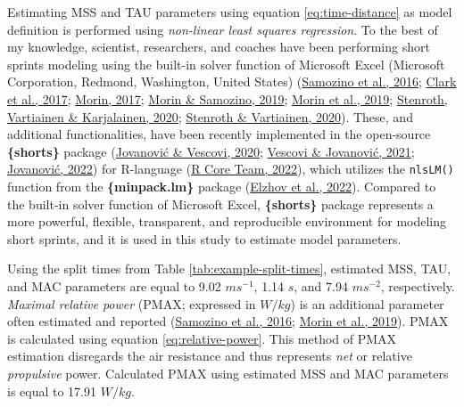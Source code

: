 \documentclass[fleqn,10pt]{wlpeerj} %
\begin{document}
Estimating MSS and TAU parameters using equation \eqref{eq:time-distance} as model definition is performed using \emph{non-linear least squares regression}. To the best of my knowledge, scientist, researchers, and coaches have been performing short sprints modeling using the built-in solver function of Microsoft Excel (Microsoft Corporation, Redmond, Washington, United States) (\protect\hyperlink{ref-samozinoSimpleMethodMeasuring2016}{Samozino et al., 2016}; \protect\hyperlink{ref-clarkNFLCombine40Yard2017}{Clark et al., 2017}; \protect\hyperlink{ref-morinSpreadsheetSprintAcceleration2017}{Morin, 2017}; \protect\hyperlink{ref-morinSpreadsheetSprintAcceleration2019}{Morin \& Samozino, 2019}; \protect\hyperlink{ref-morinSimpleMethodComputing2019}{Morin et al., 2019}; \protect\hyperlink{ref-stenrothForcevelocityProfilingIce2020}{Stenroth, Vartiainen \& Karjalainen, 2020}; \protect\hyperlink{ref-stenrothSpreadsheetSprintAcceleration2020}{Stenroth \& Vartiainen, 2020}). These, and additional functionalities, have been recently implemented in the open-source \textbf{\{shorts\}} package (\protect\hyperlink{ref-jovanovicShortsPackageModeling2020}{Jovanović \& Vescovi, 2020}; \protect\hyperlink{ref-vescoviSprintMechanicalCharacteristics2021}{Vescovi \& Jovanović, 2021}; \protect\hyperlink{ref-R-shorts}{Jovanović, 2022}) for R-language (\protect\hyperlink{ref-R-base}{R Core Team, 2022}), which utilizes the \texttt{nlsLM()} function from the \textbf{\{minpack.lm\}} package (\protect\hyperlink{ref-R-minpack.lm}{Elzhov et al., 2022}). Compared to the built-in solver function of Microsoft Excel, \textbf{\{shorts\}} package represents a more powerful, flexible, transparent, and reproducible environment for modeling short sprints, and it is used in this study to estimate model parameters.

Using the split times from Table \ref{tab:example-split-times}, estimated MSS, TAU, and MAC parameters are equal to 9.02 \(ms^{-1}\), 1.14 \(s\), and 7.94 \(ms^{-2}\), respectively. \emph{Maximal relative power} (PMAX; expressed in \(W/kg\)) is an additional parameter often estimated and reported (\protect\hyperlink{ref-samozinoSimpleMethodMeasuring2016}{Samozino et al., 2016}; \protect\hyperlink{ref-morinSimpleMethodComputing2019}{Morin et al., 2019}). PMAX is calculated using equation \eqref{eq:relative-power}. This method of PMAX estimation disregards the air resistance and thus represents \emph{net} or relative \emph{propulsive} power. Calculated PMAX using estimated MSS and MAC parameters is equal to 17.91 \(W/kg\).
\end{document}

